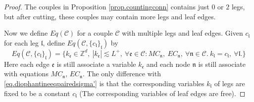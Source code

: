 \begin{proof}
The couples in Proposition \ref{prop.countingconn} contains just $0$ or $2$ legs, but after cutting, these couples may contain more legs and leaf edges. 

Now we define $Eq(\mathcal{C})$ for a couple $\mathcal{C}$ with multiple legs and leaf edges. Given $c_{\mathfrak{l}}$ for each leg $\mathfrak{l}$, define $Eq(\mathcal{C},\{c_{\mathfrak{l}}\}_{\mathfrak{l}})$ by
\begin{equation}\label{eq.Eq(C,c)}
Eq(\mathcal{C},\{c_{\mathfrak{l}}\}_{\mathfrak{l}})=\{k_{\mathfrak{e}}\in \mathbb{Z}^d,\ |k_{\mathfrak{e}}| \lesssim L^+,\ \forall \mathfrak{e}\in \mathcal{C}:MC_{\mathfrak{n}},\  EC_{\mathfrak{n}},\ \forall \mathfrak{n}\in \mathcal{C}.\ k_{\mathfrak{l}}=c_{\mathfrak{l}},\ \forall \mathfrak{l}.\}    
\end{equation}
Here each edge $\mathfrak{e}$ is still associate a variable $k_{\mathfrak{e}}$ and each node $\mathfrak{n}$ is still associate with equations $MC_{\mathfrak{n}}$, $EC_{\mathfrak{n}}$. The only difference with 
\eqref{eq.diophantineeqpairedsigma'} is that the corresponding variables $k_{\mathfrak{l}}$ of legs are fixed to be a constant $c_{\mathfrak{l}}$ (The corresponding variables of leaf edges are free).



\end{proof}
